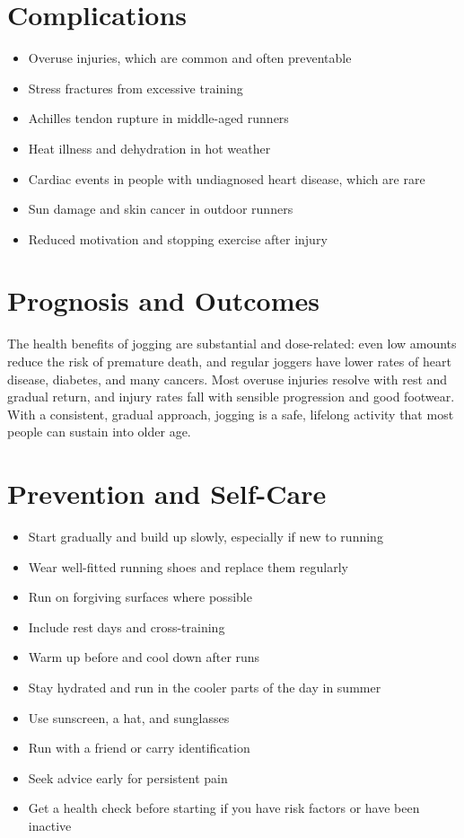 \section*{Complications}
\begin{itemize}
    \item Overuse injuries, which are common and often preventable
    \item Stress fractures from excessive training
    \item Achilles tendon rupture in middle-aged runners
    \item Heat illness and dehydration in hot weather
    \item Cardiac events in people with undiagnosed heart disease, which are rare
    \item Sun damage and skin cancer in outdoor runners
    \item Reduced motivation and stopping exercise after injury
\end{itemize}

\section*{Prognosis and Outcomes}
The health benefits of jogging are substantial and dose-related: even low amounts reduce the risk of premature death, and regular joggers have lower rates of heart disease, diabetes, and many cancers. Most overuse injuries resolve with rest and gradual return, and injury rates fall with sensible progression and good footwear. With a consistent, gradual approach, jogging is a safe, lifelong activity that most people can sustain into older age.

\section*{Prevention and Self-Care}
\begin{itemize}
    \item Start gradually and build up slowly, especially if new to running
    \item Wear well-fitted running shoes and replace them regularly
    \item Run on forgiving surfaces where possible
    \item Include rest days and cross-training
    \item Warm up before and cool down after runs
    \item Stay hydrated and run in the cooler parts of the day in summer
    \item Use sunscreen, a hat, and sunglasses
    \item Run with a friend or carry identification
    \item Seek advice early for persistent pain
    \item Get a health check before starting if you have risk factors or have been inactive
\end{itemize}

